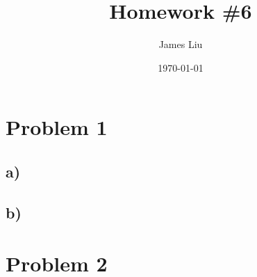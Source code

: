 \documentclass{article}
\title{\textbf{Homework \#6 }}
\author{James Liu}
\date{\today }
\begin{document}
\maketitle

\section*{Problem 1}
\subsection*{a)}
\subsection*{b)}
\section*{Problem 2}
\newpage
\end{document}
